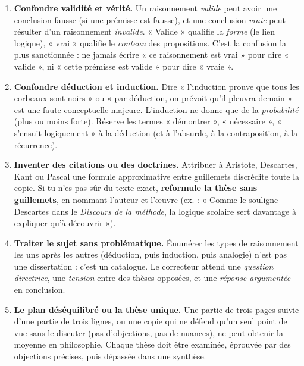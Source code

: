 \documentclass[11pt]{article}
\begin{document}
\begin{attention}
\begin{enumerate}
\item \textbf{Confondre validité et vérité.} Un raisonnement \emph{valide} peut avoir une conclusion fausse (si une prémisse est fausse), et une conclusion \emph{vraie} peut résulter d'un raisonnement \emph{invalide}. « Valide » qualifie la \emph{forme} (le lien logique), « vrai » qualifie le \emph{contenu} des propositions. C'est la confusion la plus sanctionnée : ne jamais écrire « ce raisonnement est vrai » pour dire « valide », ni « cette prémisse est valide » pour dire « vraie ».
\item \textbf{Confondre déduction et induction.} Dire « l'induction prouve que tous les corbeaux sont noirs » ou « par déduction, on prévoit qu'il pleuvra demain » est une faute conceptuelle majeure. L'induction ne donne que de la \emph{probabilité} (plus ou moins forte). Réserve les termes « démontrer », « nécessaire », « s'ensuit logiquement » à la déduction (et à l'absurde, à la contraposition, à la récurrence).
\item \textbf{Inventer des citations ou des doctrines.} Attribuer à Aristote, Descartes, Kant ou Pascal une formule approximative entre guillemets discrédite toute la copie. Si tu n'es pas sûr du texte exact, \textbf{reformule la thèse sans guillemets}, en nommant l'auteur et l'œuvre (ex. : « Comme le souligne Descartes dans le \emph{Discours de la méthode}, la logique scolaire sert davantage à expliquer qu'à découvrir »).
\item \textbf{Traiter le sujet sans problématique.} Énumérer les types de raisonnement les uns après les autres (déduction, puis induction, puis analogie) n'est pas une dissertation : c'est un catalogue. Le correcteur attend une \emph{question directrice}, une \emph{tension} entre des thèses opposées, et une \emph{réponse argumentée} en conclusion.
\item \textbf{Le plan déséquilibré ou la thèse unique.} Une partie de trois pages suivie d'une partie de trois lignes, ou une copie qui ne défend qu'un seul point de vue sans le discuter (pas d'objections, pas de nuances), ne peut obtenir la moyenne en philosophie. Chaque thèse doit être examinée, éprouvée par des objections précises, puis dépassée dans une synthèse.
\end{enumerate}
\end{attention}

\newpage
\end{document}
